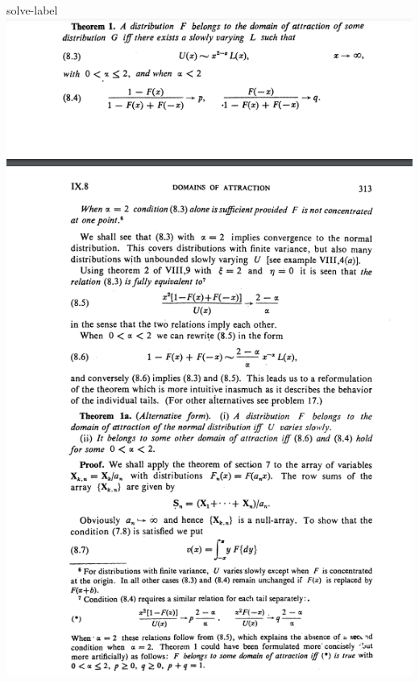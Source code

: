 \begin{solve}{}{solve-label}
\includegraphics[width = \textwidth]{pic2.png}
 \cite{r1,r2,r3,r4,r5,r6,r7}
	\end{solve}
	
	
	
	
	
